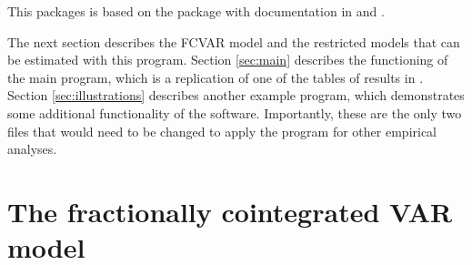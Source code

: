 \documentclass[article]{jss}
\begin{document}
This  packages is based on the  package 
with documentation in \cite{Nielsen2016} and \cite{Nielsen2013}. 


The next section describes the FCVAR model and the restricted models that can be estimated with this program. Section \ref{sec:main} describes the functioning of the main program, which is a replication of one of the tables of results in \cite{JNP2014}. Section \ref{sec:illustrations} describes another example program, which demonstrates some additional functionality of the software. Importantly, these are the only two files that would need to be changed to apply the program for other empirical analyses. 




\section{The fractionally cointegrated VAR model} \label{sec:fcvar}

\end{document}
